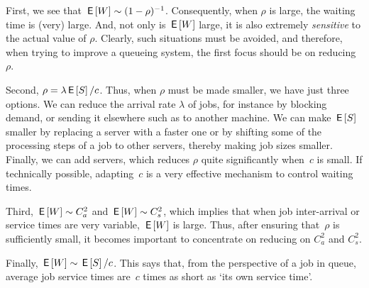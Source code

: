 \documentclass[stochastic-or.tex]{subfiles}
\begin{document}
First, we see that $\,\mathsf{E}\left[W\right] \sim (1-\rho)^{-1}$.
Consequently, when $\rho$ is large, the waiting time is (very) large. And,
not only is $\,\mathsf{E}\left[W\right]$ large, it is also extremely \emph{sensitive} to the actual value of $\rho$.
Clearly, such situations must be avoided, and therefore, when trying to improve a queueing system, the first focus should be on reducing~$\rho$.

Second, $\rho = \lambda \,\mathsf{E}\left[S\right]/c$.
Thus, when $\rho$ must be made smaller, we have just three options.
We can reduce the arrival rate $\lambda$ of jobs, for instance by blocking demand, or sending it elsewhere such as to another machine.
We can make $\,\mathsf{E}\left[S\right]$ smaller by replacing a server with a faster one or by shifting some of the processing steps of a job to other servers, thereby making job sizes smaller.
Finally, we can add servers, which reduces $\rho$ quite significantly when~$c$ is small.
If technically possible, adapting~$c$ is a very effective mechanism to control waiting times.

Third, $\,\mathsf{E}\left[W\right] \sim C_a^2$ and $\,\mathsf{E}\left[W\right] \sim C_s^2$, which implies that when job inter-arrival or service times are very variable, $\,\mathsf{E}\left[W\right]$ is large.
Thus, after ensuring that~$\rho$ is sufficiently small, it becomes important to concentrate on reducing on $C_a^2$ and $C_s^2$.

Finally, $\,\mathsf{E}\left[W\right] \sim \,\mathsf{E}\left[S\right]/c$.
This says that, from the perspective of a job in queue, average job service times are~$c$ times as short as `its own service time'.



\end{document}

